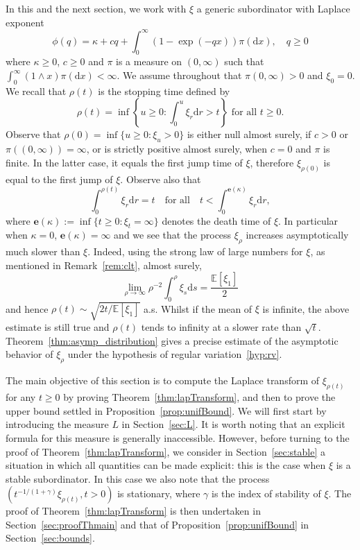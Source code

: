 \documentclass[AHL,Unicode,longabstracts,published]{cedram}
\newcommand{\bbE}{\mathbb{E}}
\newcommand{\dd}{\mathrm{d}}
\newcommand{\bfe}{\mathbf{e}}
\begin{document}
In this and the next section, we work with $\xi$ a generic subordinator with Laplace exponent
\[
\phi(q)=\kappa+cq+\int_0^{\infty} \left(1-\exp(-qx)\right)\pi(\dd x), \quad q \geq 0
\]
where $\kappa \geq 0$, $c \geq 0$ and $\pi$ is a measure on $(0,\infty)$ such that $\int_0^{\infty} (1 \wedge x) \pi(\dd x)<\infty$. We assume throughout that $\pi(0,\infty)>0$ and $\xi_0=0$. We recall that $\rho(t)$ is the stopping time defined by
\begin{equation}\label{eq:time_change}
\rho(t)=\inf \left\{u \geq 0 : \int_0^u \xi_r \dd r >t \right\} \text{ for all }t\geq 0.
\end{equation}
Observe that $\rho(0) = \inf\{u \geq 0 : \xi_u > 0\}$ is either null almost surely, if $c > 0$ or $\pi((0,\infty)) = \infty$, or is strictly positive almost surely, when $c=0$ and $\pi$ is finite. In the latter case, it equals the first jump time of $\xi$, therefore $\xi_{\rho(0)}$ is equal to the first jump of $\xi$. Observe also that
\[
\int_0^{\rho(t)} \xi_r \dd r =t \quad \text{for all} \quad t <\int_0^{\bfe(\kappa)}\xi_r \dd r,
\]
where $\bfe(\kappa):=\inf\{t \geq 0:\xi_t=\infty\}$ denotes the death time of $\xi$. In particular when $\kappa=0$, $\bfe(\kappa)=\infty$ and we see that the process $\xi_{\rho}$ increases asymptotically much slower than $\xi$. Indeed, using the strong law of large numbers for $\xi$, as mentioned in Remark~\ref{rem:clt}, almost surely,
\[
\lim_{\rho \to \infty} \rho^{-2}\int_0^{\rho} \xi_s \dd s = \frac{\bbE[\xi_1]}{2}
\]
and hence $\rho(t) \sim \sqrt{2t/\bbE[\xi_1]}$ a.s. Whilst if the mean of $\xi$ is infinite, the above estimate is still true and $\rho(t)$ tends to infinity at a slower rate than $\sqrt t$. Theorem~\ref{thm:asymp_distribution} gives a precise estimate of the asymptotic behavior of $\xi_{\rho}$ under the hypothesis of regular variation~\eqref{hyp:rv}.

The main objective of this section is to compute the Laplace transform of $\xi_{\rho(t)}$ for any $t\geq 0$ by proving Theorem~\ref{thm:lapTransform}, and then to prove the upper bound settled in Proposition~\ref{prop:unifBound}. We will first start by introducing the measure $L$ in Section~\ref{sec:L}. It is worth noting that an explicit formula for this measure is generally inaccessible. However, before turning to the proof of Theorem~\ref{thm:lapTransform}, we consider in Section~\ref{sec:stable} a situation in which all quantities can be made explicit: this is the case when $\xi$ is a stable subordinator. In this case we also note that the process $(t^{-1/(1+\gamma)}\xi_{\rho(t)},t >0)$ is stationary, where $\gamma$ is the index of stability of $\xi$. The proof of Theorem~\ref{thm:lapTransform} is then undertaken in Section~\ref{sec:proofThmain} and that of Proposition~\ref{prop:unifBound} in Section~\ref{sec:bounds}.
\end{document}
